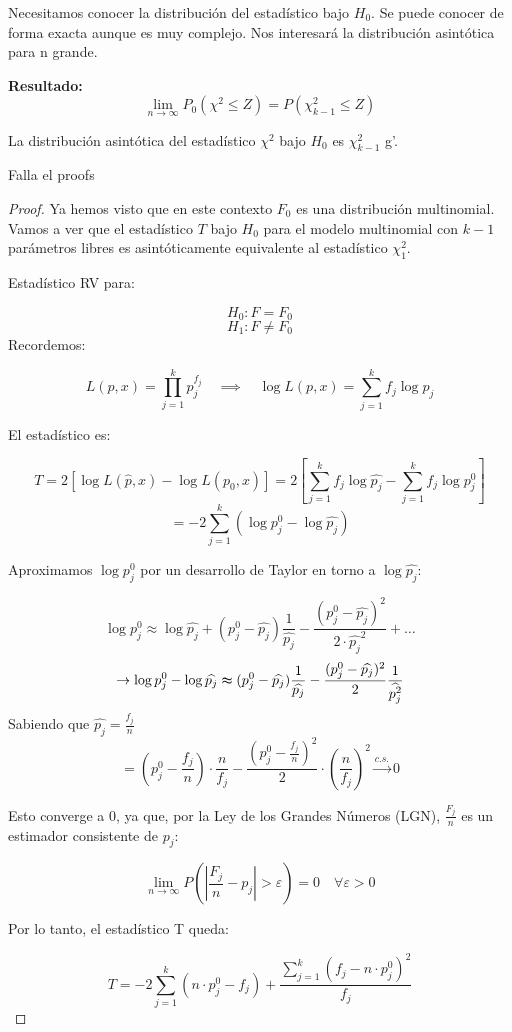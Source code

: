  Necesitamos conocer la distribución del estadístico bajo $H_0$.
 Se puede conocer de forma exacta aunque es muy complejo. Nos interesará la distribución asintótica para n grande.

 \textbf{Resultado:}
 \[
 \lim_{n \to \infty} P_0(\chi^2 \leq Z)=P(\chi^2_{k-1} \leq Z)
 \]

La distribución asintótica del estadístico $\chi^2$ bajo $H_0$ es $\chi^2_{k-1}$ g'.



Falla el proofs
\begin{proof}
Ya hemos visto que en este contexto \( F_0 \) es una distribución multinomial. 
Vamos a ver que el estadístico \( T \) bajo \( H_0 \) para el modelo multinomial con \( k-1 \) parámetros libres es asintóticamente equivalente al estadístico \( \chi^2_1 \).

Estadístico RV para:

\[
H_0: F = F_0
\]
\[
H_1: F \neq F_0
\]
\newpage
Recordemos:

\[
L(p, x) = \prod_{j=1}^{k} p_j^{f_j} \quad \implies \quad \log L(p, x) = \sum_{j=1}^{k} f_j \log p_j
\]

El estadístico es:

\[
T = 2 \left[\log L(\widehat{p}, x) - \log L(p_0, x)\right] = 2 \left[ \sum_{j=1}^{k} f_j \log \widehat{p_j} - \sum_{j=1}^{k} f_j \log p_j^0 \right] 
\]\[= -2 \sum_{j=1}^{k} \left( \log p_j^0 - \log \widehat{p_j} \right)
\]

Aproximamos \( \log p_j^0 \) por un desarrollo de Taylor en torno a \( \log \widehat{p_j} \):

\[
\log p_j^0 \approx \log \widehat{p_j} + (p_j^0 - \widehat{p_j}) \frac{1}{\widehat{p_j}} - \frac{(p_j^0 - \widehat{p_j})^2}{2 \cdot \widehat{p_j}^2}+ \dots
\]
\[
\to \log p_j^0- \log \widehat{p_j}\thickapprox (p^0_j-\widehat{p_j}) \frac{1}{\widehat{p_j}}- \frac{(p^0_j-\widehat{p_j})^2}{2}\frac{1}{\widehat{p_j^2}}
\]
Sabiendo que $\widehat{p_j}=\frac{f_j}{n}$
\[
=\left(p_j^0-\frac{f_j}{n}\right) \cdot \frac{n}{f_j} - \frac{\left(p_j^0-\frac{f_j}{n}\right)^2}{2}\cdot \left(\frac{n}{f_j}\right)^2 \xrightarrow{c.s.} 0
\]

Esto converge a 0, ya que, por la Ley de los Grandes Números (LGN), \( \frac{F_j}{n} \) es un estimador consistente de \( p_j \):

\[
\lim_{n \to \infty} P \left( \left| \frac{F_j}{n} - p_j \right| > \varepsilon \right) = 0 \quad \forall \varepsilon>0
\]

Por lo tanto, el estadístico T queda:

\[
T = -2 \sum_{j=1}^{k} \left( n \cdot p_j^0 - f_j \right) + \frac{\sum_{j=1}^{k} (f_j - n \cdot p_j^0)^2}{f_j}
\]

\end{proof}


